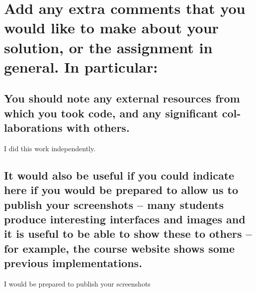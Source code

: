 \documentclass[11pt]{article}
\begin{document}
\section{Add any extra comments that you would like to make about your solution, or the assignment in general. In particular:}
\subsection{You should note any external resources from which you took code, and any significant col- laborations with others.}
I did this work independently.
\subsection{It would also be useful if you could indicate here if you would be prepared to allow us to publish your screenshots – many students produce interesting interfaces and images and it is useful to be able to show these to others – for example, the course website shows some previous implementations.}
I would be prepared to publish your screenshots
\end{document}
